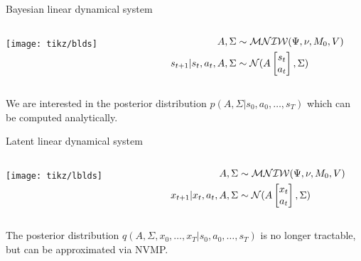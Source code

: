 \documentclass[10pt, compress]{beamer}
\begin{document}
\begin{frame}{Bayesian linear dynamical system}
  \begin{columns}
    \begin{column}{0.3\textwidth}
        \texttt{[image: tikz/blds]}
    \end{column}
    \begin{column}{0.3\textwidth}
      \begin{align*}
        A, \Sigma &\sim \mathcal{MNIW}(\Psi, \nu, M_0, V) \\
        s_{t + 1} | s_t, a_t, A, \Sigma &\sim \mathcal{N}(A\begin{bmatrix}s_t\\a_t\end{bmatrix}, \Sigma)
      \end{align*}
    \end{column}
  \end{columns}
	We are interested in the posterior distribution 
	$
	p(A, \Sigma | {s_0, a_0, \ldots, s_T})
	$
	which can be computed analytically.
\end{frame}

\begin{frame}{Latent linear dynamical system}
  \begin{columns}
    \begin{column}{0.3\textwidth}
        \texttt{[image: tikz/lblds]}
    \end{column}
    \begin{column}{0.6\textwidth}
      \begin{align*}
        A, \Sigma &\sim \mathcal{MNIW}(\Psi, \nu, M_0, V) \\
        x_{t + 1} | x_t, a_t, A, \Sigma &\sim \mathcal{N}(A\begin{bmatrix}x_t\\a_t\end{bmatrix}, \Sigma)
      \end{align*}
    \end{column}
  \end{columns}
	The posterior distribution 
	$
	q(A, \Sigma, x_0, \ldots, x_T | {s_0, a_0, \ldots, s_T})
	$
	is no longer tractable, but can be approximated via NVMP.
\end{frame}
\end{document}
